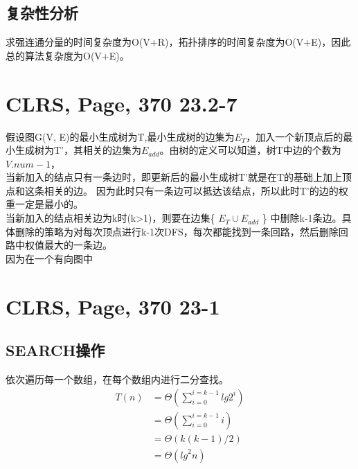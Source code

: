 \documentclass[UTF8]{ctexart}
\begin{document}
 \subsection{复杂性分析}
 求强连通分量的时间复杂度为O(V+R)，拓扑排序的时间复杂度为O(V+E)，因此总的算法复杂度为O(V+E)。


\section{CLRS, Page, 370 23.2-7}

假设图G(V, E)的最小生成树为T,最小生成树的边集为$E_T$，加入一个新顶点后的最小生成树为T'，其相关的边集为$E_{add}$。由树的定义可以知道，树T中边的个数为$V.num-1$，\\
当新加入的结点只有一条边时，即更新后的最小生成树T'就是在T的基础上加上顶点和这条相关的边。
因为此时只有一条边可以抵达该结点，所以此时T'的边的权重一定是最小的。\\
当新加入的结点相关边为k时(k>1)，则要在边集\{ $E_{T} \cup E_{add}$ \} 中删除k-1条边。具体删除的策略为对每次顶点进行k-1次DFS，每次都能找到一条回路，然后删除回路中权值最大的一条边。\\
因为在一个有向图中





\section{CLRS, Page, 370 23-1}

\subsection{SEARCH操作}
依次遍历每一个数组，在每个数组内进行二分查找。
\begin{align*}
    T(n)    &=  \Theta  (\sum_{i = 0}^{i = k-1}lg2^i )  \\  
            &=  \Theta  (\sum_{i = 0}^{i = k-1}i ) \\
            &= \Theta  (k(k-1)/2)\\
            &= \Theta({lg}^2n)
\end{align*}
\end{document}
